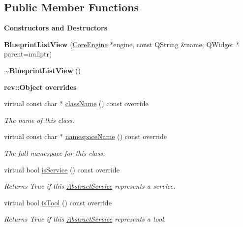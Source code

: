 \subsection*{Public Member Functions}
\begin{Indent}\textbf{ Constructors and Destructors}\par
\begin{DoxyCompactItemize}
\item 
\mbox{\label{classrev_1_1_view_1_1_blueprint_list_view_a056f74cbc6e0bfe647dcc7ecd5c45d47}} 
{\bfseries Blueprint\+List\+View} (\mbox{\hyperlink{classrev_1_1_core_engine}{Core\+Engine}} $\ast$engine, const Q\+String \&name, Q\+Widget $\ast$parent=nullptr)
\item 
\mbox{\label{classrev_1_1_view_1_1_blueprint_list_view_a0aa6e90dd4fecde4868938cd146cf147}} 
{\bfseries $\sim$\+Blueprint\+List\+View} ()
\end{DoxyCompactItemize}
\end{Indent}
\begin{Indent}\textbf{ rev\+::Object overrides}\par
\begin{DoxyCompactItemize}
\item 
virtual const char $\ast$ \mbox{\hyperlink{classrev_1_1_view_1_1_blueprint_list_view_ab64a820b0e1fff62711f536fc89bf832}{class\+Name}} () const override
\begin{DoxyCompactList}\small\item\em The name of this class. \end{DoxyCompactList}\item 
virtual const char $\ast$ \mbox{\hyperlink{classrev_1_1_view_1_1_blueprint_list_view_af706f0869b486cbe80ef9457723c9de6}{namespace\+Name}} () const override
\begin{DoxyCompactList}\small\item\em The full namespace for this class. \end{DoxyCompactList}\item 
virtual bool \mbox{\hyperlink{classrev_1_1_view_1_1_blueprint_list_view_a7f8fad1a94d496b12dcfb2066de06f48}{is\+Service}} () const override
\begin{DoxyCompactList}\small\item\em Returns True if this \mbox{\hyperlink{classrev_1_1_abstract_service}{Abstract\+Service}} represents a service. \end{DoxyCompactList}\item 
virtual bool \mbox{\hyperlink{classrev_1_1_view_1_1_blueprint_list_view_aa3ae7a92fc6bf701aec067392f93d2a7}{is\+Tool}} () const override
\begin{DoxyCompactList}\small\item\em Returns True if this \mbox{\hyperlink{classrev_1_1_abstract_service}{Abstract\+Service}} represents a tool. \end{DoxyCompactList}\end{DoxyCompactItemize}
\end{Indent}
